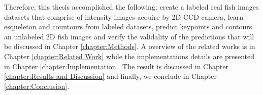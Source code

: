 Therefore, this thesis accomplished the following: create a labeled real fish images datasets
that comprise of intensity images acquire by 2D CCD camera, learn esqueleton and countours from
labeled datasets, predict keypoints and contours an unlabeled 2D fish images and verify the validality
of the predictions that will be discussed in Chapter \ref{chapter:Methods}. A overview
of the related works is in Chapter \ref{chapter:Related Work} while the implementations details are
presented in Chapter \ref{chapter:Implementation}. The result is discussed in Chapter \ref{chapter:Results and Discussion}
 and finally, we conclude in Chapter \ref{chapter:Conclusion}.

	


